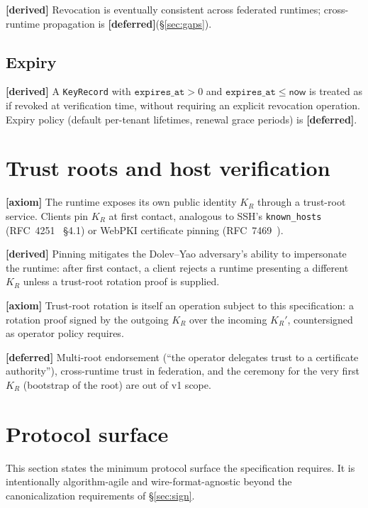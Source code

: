 \documentclass[11pt,a4paper]{article}
\newcommand{\axiom}{\textcolor{axiomcolor}{\textbf{[axiom]}}\xspace}
\newcommand{\derived}{\textcolor{derivedcolor}{\textbf{[derived]}}\xspace}
\newcommand{\deferred}{\textcolor{deferredcolor}{\textbf{[deferred]}}\xspace}
\begin{document}
\derived{} Revocation is eventually consistent across federated
runtimes; cross-runtime propagation is \deferred (\S\ref{sec:gaps}).

\subsection{Expiry}

\derived{} A \texttt{KeyRecord} with
$\mathtt{expires\_at} > 0$ and $\mathtt{expires\_at} \le \mathsf{now}$
is treated as if revoked at verification time, without requiring an
explicit revocation operation. Expiry policy (default per-tenant
lifetimes, renewal grace periods) is \deferred.

\section{Trust roots and host verification}
\label{sec:trust-root}

\axiom{} The runtime exposes its own public identity $K_R$ through a
trust-root service. Clients pin $K_R$ at first contact, analogous to
SSH's \texttt{known\_hosts} (RFC~4251~\cite{rfc4251} \S4.1) or
WebPKI certificate pinning (RFC~7469~\cite{rfc7469}).

\derived{} Pinning mitigates the Dolev--Yao adversary's ability to
impersonate the runtime: after first contact, a client rejects a
runtime presenting a different $K_R$ unless a trust-root rotation proof
is supplied.

\axiom{} Trust-root rotation is itself an operation subject to this
specification: a rotation proof signed by the outgoing $K_R$ over the
incoming $K_R'$, countersigned as operator policy requires.

\deferred{} Multi-root endorsement (``the operator delegates trust to
a certificate authority''), cross-runtime trust in federation, and
the ceremony for the very first $K_R$ (bootstrap of the root) are
out of v1 scope.

\section{Protocol surface}
\label{sec:protocol}

This section states the minimum protocol surface the specification
requires. It is intentionally algorithm-agile and wire-format-agnostic
beyond the canonicalization requirements of \S\ref{sec:sign}.
\end{document}
